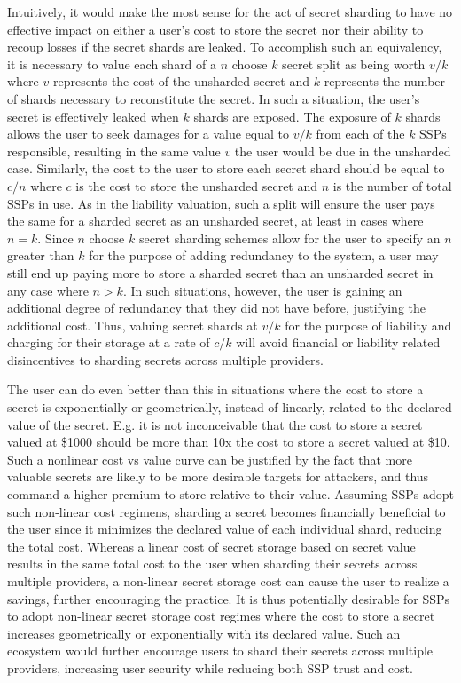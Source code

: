 Intuitively, it would make the most sense for the act of secret
sharding to have no effective impact on either a user's cost to store
the secret nor their ability to recoup losses if the secret shards are
leaked. To accomplish such an equivalency, it is necessary to value
each shard of a $n$ choose $k$ secret split as being worth $v/k$ where
$v$ represents the cost of the unsharded secret and $k$ represents the
number of shards necessary to reconstitute the secret. In such a
situation, the user's secret is effectively leaked when $k$ shards are
exposed. The exposure of $k$ shards allows the user to seek damages
for a value equal to $v/k$ from each of the $k$ SSPs responsible,
resulting in the same value $v$ the user would be due in the unsharded
case. Similarly, the cost to the user to store each secret shard
should be equal to $c/n$ where $c$ is the cost to store the unsharded
secret and $n$ is the number of total SSPs in use. As in the liability
valuation, such a split will ensure the user pays the same for a
sharded secret as an unsharded secret, at least in cases where
$n=k$. Since $n$ choose $k$ secret sharding schemes allow for the user
to specify an $n$ greater than $k$ for the purpose of adding redundancy
to the system, a user may still end up paying more to store a sharded
secret than an unsharded secret in any case where $n>k$. In such
situations, however, the user is gaining an additional degree of
redundancy that they did not have before, justifying the additional
cost. Thus, valuing secret shards at $v/k$ for the purpose of
liability and charging for their storage at a rate of $c/k$ will avoid
financial or liability related disincentives to sharding secrets
across multiple providers.

The user can do even better than this in situations where the cost to
store a secret is exponentially or geometrically, instead of linearly,
related to the declared value of the secret. E.g. it is not
inconceivable that the cost to store a secret valued at \$1000 should
be more than 10x the cost to store a secret valued at \$10. Such a
nonlinear cost vs value curve can be justified by the fact that more
valuable secrets are likely to be more desirable targets for
attackers, and thus command a higher premium to store relative to
their value. Assuming SSPs adopt such non-linear cost regimens,
sharding a secret becomes financially beneficial to the user since it
minimizes the declared value of each individual shard, reducing the
total cost. Whereas a linear cost of secret storage based on secret
value results in the same total cost to the user when sharding their
secrets across multiple providers, a non-linear secret storage cost
can cause the user to realize a savings, further encouraging the
practice. It is thus potentially desirable for SSPs to adopt
non-linear secret storage cost regimes where the cost to store a
secret increases geometrically or exponentially with its declared
value. Such an ecosystem would further encourage users to shard their
secrets across multiple providers, increasing user security while
reducing both SSP trust and cost.

